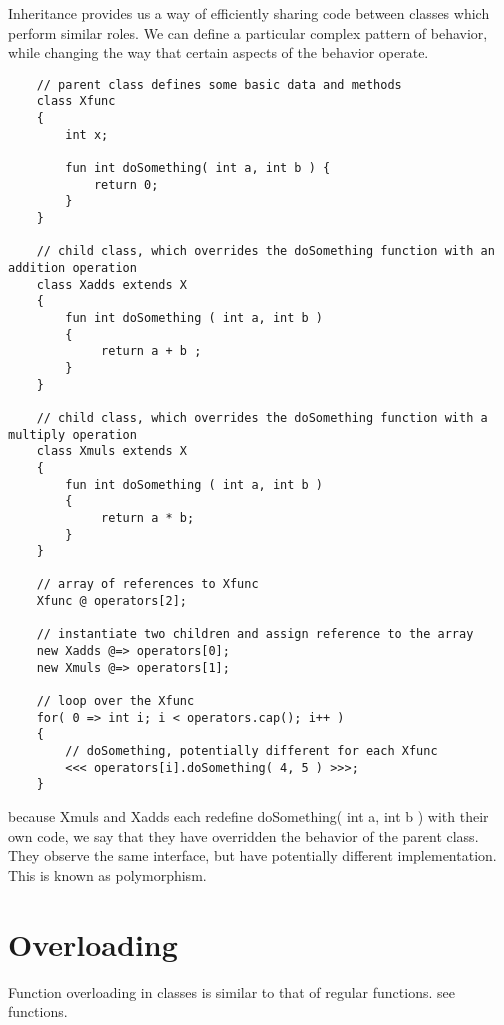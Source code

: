 Inheritance provides us a way of efficiently sharing code between classes which perform similar roles. We can define a particular complex pattern of behavior, while changing the way that certain aspects of the behavior operate.
\begin{verbatim}
    // parent class defines some basic data and methods 
    class Xfunc
    { 
        int x; 

        fun int doSomething( int a, int b ) { 
            return 0; 
        }
    }

    // child class, which overrides the doSomething function with an addition operation
    class Xadds extends X
    { 
        fun int doSomething ( int a, int b )
        { 
             return a + b ; 
        }
    }

    // child class, which overrides the doSomething function with a multiply operation 
    class Xmuls extends X
    { 
        fun int doSomething ( int a, int b )
        { 
             return a * b; 
        }
    }

    // array of references to Xfunc
    Xfunc @ operators[2];

    // instantiate two children and assign reference to the array 
    new Xadds @=> operators[0];
    new Xmuls @=> operators[1];

    // loop over the Xfunc
    for( 0 => int i; i < operators.cap(); i++ )
    {
        // doSomething, potentially different for each Xfunc
        <<< operators[i].doSomething( 4, 5 ) >>>;
    }
\end{verbatim}
because Xmuls and Xadds each redefine doSomething( int a, int b ) with their own code, we say that they have overridden the behavior of the parent class. They observe the same interface, but have potentially different implementation. This is known as polymorphism.

\section{Overloading}

Function overloading in classes is similar to that of regular functions. see functions.
